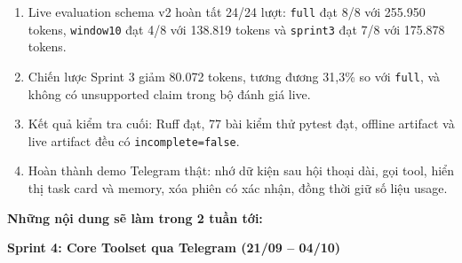 \documentclass[12pt,a4paper]{article}
\begin{document}
\begin{enumerate}
    \item Live evaluation schema v2 hoàn tất 24/24 lượt: \texttt{full} đạt 8/8 với 255.950 tokens, \texttt{window10} đạt 4/8 với 138.819 tokens và \texttt{sprint3} đạt 7/8 với 175.878 tokens.

    \item Chiến lược Sprint 3 giảm 80.072 tokens, tương đương 31,3\% so với \texttt{full}, và không có unsupported claim trong bộ đánh giá live.

    \item Kết quả kiểm tra cuối: Ruff đạt, 77 bài kiểm thử pytest đạt, offline artifact và live artifact đều có \texttt{incomplete=false}.

    \item Hoàn thành demo Telegram thật: nhớ dữ kiện sau hội thoại dài, gọi tool, hiển thị task card và memory, xóa phiên có xác nhận, đồng thời giữ số liệu usage.
\end{enumerate}

\textbf{Những nội dung sẽ làm trong 2 tuần tới:}

\textbf{Sprint 4: Core Toolset qua Telegram (21/09 -- 04/10)}
\end{document}
